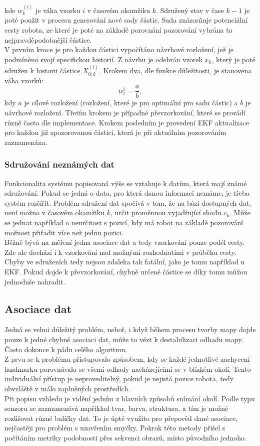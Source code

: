 \documentclass[12pt]{article}
\begin{document}
kde $w^{(i)}_{k}$ je váha vzorku $i$ v časovém okamžiku $k$. Sdružený stav v čase $k-1$ je poté použit v procesu generování nové sady částic. Sada znázorňuje potenciální cesty robota, ze které je poté na základě porovnání pozorování vybrána ta nejpravděpodobnější částice.\\
\indent V prvním kroce je pro každou částici vypočítáno návrhové rozložení, jež je podmíněno svojí specifickou historií. Z návrhu je odebrán vzorek $x_k$, který je poté sdružen k historii částice $X^{(i)}_{0:k}$. Krokem dva, dle funkce důležitosti, je stanovena váha vzorků:
\begin{equation}
	w_t^i=\frac{a}{b},
\end{equation}
kdy $a$ je cílové rozložení (rozložení, které je pro optimální pro sadu částic) a $b$ je návrhové rozložení. Třetím krokem je případné převzorkování, které se provádí různě často dle implementace. Krokem posledním je provedení EKF aktualizace pro každou již zpozorovanou částici, která je při aktuálním pozorováním zaznamenána. \\

\subsubsection{Sdružování neznámých dat}
Funkcionalita systému popisovaná výše se vztahuje k datům, která mají známé sdružování. Pokud se jedná o data, pro která danou informaci nemáme, je třeba systém rozšířit. Problém sdružení dat spočívá v tom, že na bázi dostupných dat, není možno v časovém okamžiku $k$, určit proměnnou vyjadřující shodu $c_k$. Může se jednat například o neurčitost s pozicí, kdy má robot na základě pozorování možnost přiřadit více než jednu pozici.\\
\indent Běžně bývá na měření jedna asociace dat a tedy vzorkování pouze podél cesty. Zde ale dochází i k vzorkování nad možnými rozhodnutími v průběhu cesty. Chyby ve sdruženích tedy nejsou zdaleka tak fatální, jako je tomu například u EKF. Pokud dojde k převzorkování, chybně určené částice se díky tomu můžou jednoduše nahradit.

\newpage
\subsection{Asociace dat}
Jedná se velmi důležitý problém, neboť, i když během procesu tvorby mapy dojde pouze k jedné chybné asociaci dat, může to vézt k destabilizaci odhadu mapy. Často dokonce k pádu celého algoritmu.\\
\indent Z prvu se k problému přistupovalo způsobem, kdy se každé jednotlivé zachycení landmarku porovnávalo se všemi odhady nacházejícími se v blízkém okolí. Tento individuální přístup je neproveditelný, pokud je nejistá pozice robota, tedy obvzláště v málo zaplněných prostředích. \\
\indent Při popisu vzhledu je vidění jedním z hlavních způsobů snímání okolí. Podle typu senzoru se zaznamenává například tvar, barva, struktura, a tím je možné rozlišovat různé balíčky dat. To je úpté využito pro přepověd dané asociace, nejčastěji pro problém s uzavřením smyčky. Pokrok této metody přišel s počítáním metriky podobnosti přes sekvenci obrazů, místo původního jednoho. 
\end{document}
